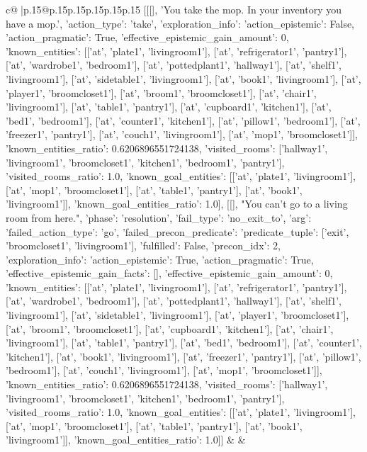 \documentclass{article}
\begin{document}
{\begin{supertabular}{c@{$\;$}|p{.15\linewidth}@{}p{.15\linewidth}p{.15\linewidth}p{.15\linewidth}p{.15\linewidth}p{.15\linewidth}}
{{{	 [[[], 'You take the mop. In your inventory you have a mop.', {'action_type': 'take', 'exploration_info': {'action_epistemic': False, 'action_pragmatic': True, 'effective_epistemic_gain_amount': 0, 'known_entities': [['at', 'plate1', 'livingroom1'], ['at', 'refrigerator1', 'pantry1'], ['at', 'wardrobe1', 'bedroom1'], ['at', 'pottedplant1', 'hallway1'], ['at', 'shelf1', 'livingroom1'], ['at', 'sidetable1', 'livingroom1'], ['at', 'book1', 'livingroom1'], ['at', 'player1', 'broomcloset1'], ['at', 'broom1', 'broomcloset1'], ['at', 'chair1', 'livingroom1'], ['at', 'table1', 'pantry1'], ['at', 'cupboard1', 'kitchen1'], ['at', 'bed1', 'bedroom1'], ['at', 'counter1', 'kitchen1'], ['at', 'pillow1', 'bedroom1'], ['at', 'freezer1', 'pantry1'], ['at', 'couch1', 'livingroom1'], ['at', 'mop1', 'broomcloset1']], 'known_entities_ratio': 0.6206896551724138, 'visited_rooms': ['hallway1', 'livingroom1', 'broomcloset1', 'kitchen1', 'bedroom1', 'pantry1'], 'visited_rooms_ratio': 1.0, 'known_goal_entities': [['at', 'plate1', 'livingroom1'], ['at', 'mop1', 'broomcloset1'], ['at', 'table1', 'pantry1'], ['at', 'book1', 'livingroom1']], 'known_goal_entities_ratio': 1.0}}], [[], "You can't go to a living room from here.", {'phase': 'resolution', 'fail_type': 'no_exit_to', 'arg': {'failed_action_type': 'go', 'failed_precon_predicate': {'predicate_tuple': ['exit', 'broomcloset1', 'livingroom1'], 'fulfilled': False, 'precon_idx': 2}}, 'exploration_info': {'action_epistemic': True, 'action_pragmatic': True, 'effective_epistemic_gain_facts': [], 'effective_epistemic_gain_amount': 0, 'known_entities': [['at', 'plate1', 'livingroom1'], ['at', 'refrigerator1', 'pantry1'], ['at', 'wardrobe1', 'bedroom1'], ['at', 'pottedplant1', 'hallway1'], ['at', 'shelf1', 'livingroom1'], ['at', 'sidetable1', 'livingroom1'], ['at', 'player1', 'broomcloset1'], ['at', 'broom1', 'broomcloset1'], ['at', 'cupboard1', 'kitchen1'], ['at', 'chair1', 'livingroom1'], ['at', 'table1', 'pantry1'], ['at', 'bed1', 'bedroom1'], ['at', 'counter1', 'kitchen1'], ['at', 'book1', 'livingroom1'], ['at', 'freezer1', 'pantry1'], ['at', 'pillow1', 'bedroom1'], ['at', 'couch1', 'livingroom1'], ['at', 'mop1', 'broomcloset1']], 'known_entities_ratio': 0.6206896551724138, 'visited_rooms': ['hallway1', 'livingroom1', 'broomcloset1', 'kitchen1', 'bedroom1', 'pantry1'], 'visited_rooms_ratio': 1.0, 'known_goal_entities': [['at', 'plate1', 'livingroom1'], ['at', 'mop1', 'broomcloset1'], ['at', 'table1', 'pantry1'], ['at', 'book1', 'livingroom1']], 'known_goal_entities_ratio': 1.0}}]] 
	  } 
	   } 
	   } 
	 & & \\ 
 


\end{supertabular}}
\end{document}
